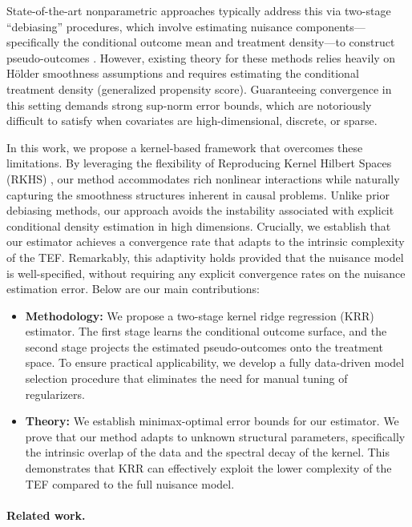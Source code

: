 \documentclass[english,11pt]{article}
\begin{document}
State-of-the-art nonparametric approaches typically address this via two-stage ``debiasing'' procedures, which involve estimating nuisance components—specifically the conditional outcome mean and treatment density—to construct pseudo-outcomes \citep{kennedy2017non,colangelo2025double,bonvini2022fast}. However, existing theory for these methods relies heavily on Hölder smoothness assumptions and requires estimating the conditional treatment density (generalized propensity score). Guaranteeing convergence in this setting demands strong sup-norm error bounds, which are notoriously difficult to satisfy when covariates are high-dimensional, discrete, or sparse.

In this work, we propose a kernel-based framework that overcomes these limitations. By leveraging the flexibility of Reproducing Kernel Hilbert Spaces (RKHS) \citep{scholkopf2002learning}, our method accommodates rich nonlinear interactions while naturally capturing the smoothness structures inherent in causal problems. Unlike prior debiasing methods, our approach avoids the instability associated with explicit conditional density estimation in high dimensions. Crucially, we establish that our estimator achieves a convergence rate that adapts to the intrinsic complexity of the TEF. Remarkably, this adaptivity holds provided that the nuisance model is well-specified, without requiring any explicit convergence rates on the nuisance estimation error. Below are our main contributions:

\begin{itemize}
    \item \textbf{Methodology:} We propose a two-stage kernel ridge regression (KRR) estimator. The first stage learns the conditional outcome surface, and the second stage projects the estimated pseudo-outcomes onto the treatment space. To ensure practical applicability, we develop a fully data-driven model selection procedure that eliminates the need for manual tuning of regularizers.

    \item \textbf{Theory:} We establish minimax-optimal error bounds for our estimator. We prove that our method adapts to unknown structural parameters, specifically the intrinsic overlap of the data and the spectral decay of the kernel. This demonstrates that KRR can effectively exploit the lower complexity of the TEF compared to the full nuisance model.
\end{itemize}

\paragraph{Related work.}
\end{document}
